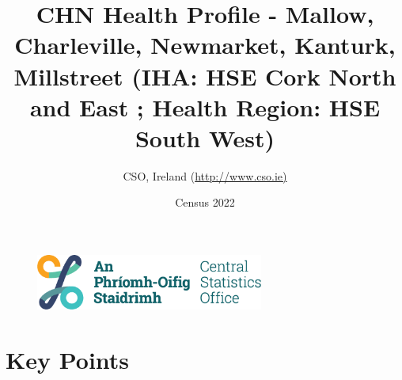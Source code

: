 \documentclass{article}
\title{CHN Health Profile - Mallow, Charleville, Newmarket, Kanturk, Millstreet (IHA: HSE Cork North and East ;  Health Region: HSE South West) }
\date{Census 2022}
\author{CSO, Ireland  (\url{http://www.cso.ie)}}
\begin{document}


\begin{figure}
	\centering
\includegraphics[width =75mm]{../figures/CSO_Logo.png}
\end{figure}

				 
		   
						  
														  
																																													
												 
			 
\maketitle
					
													   
				 
						 
																																																																											   
				 
				  
  \pagebreak
    	    \tableofcontents

\pagebreak


\section{Key Points}
\end{document}
